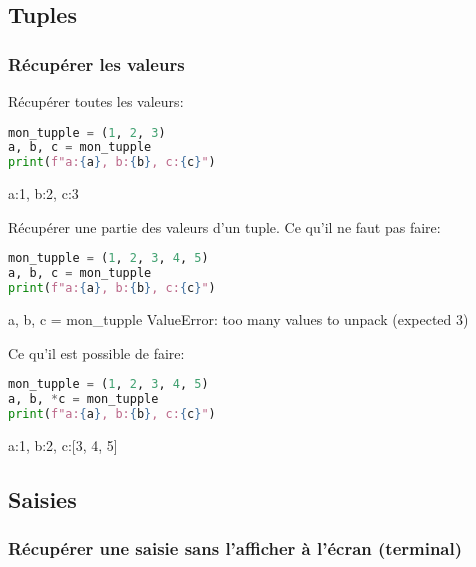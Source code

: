 \subsection{Tuples}

\subsubsection{Récupérer les valeurs}

Récupérer toutes les valeurs:
\begin{lstlisting}[language=Python]
mon_tupple = (1, 2, 3)
a, b, c = mon_tupple
print(f"a:{a}, b:{b}, c:{c}")
\end{lstlisting}

\begin{terminal}
a:1, b:2, c:3
\end{terminal}

Récupérer une partie des valeurs d'un tuple. Ce qu'il ne faut pas faire:
\begin{lstlisting}[language=Python]
mon_tupple = (1, 2, 3, 4, 5)
a, b, c = mon_tupple
print(f"a:{a}, b:{b}, c:{c}")
\end{lstlisting}
\begin{terminal}
    a, b, c = mon_tupple
ValueError: too many values to unpack (expected 3)
\end{terminal}
Ce qu'il est possible de faire:
\begin{lstlisting}[language=Python]
mon_tupple = (1, 2, 3, 4, 5)
a, b, *c = mon_tupple
print(f"a:{a}, b:{b}, c:{c}")
\end{lstlisting}

\begin{terminal}
a:1, b:2, c:[3, 4, 5]
\end{terminal}



\subsection{Saisies}

\subsubsection{Récupérer une saisie sans l'afficher à l'écran (terminal)}

